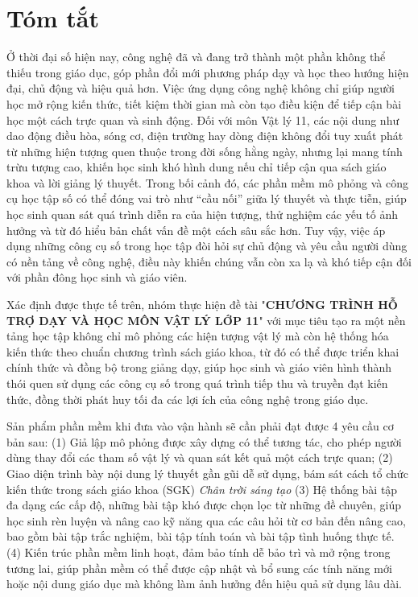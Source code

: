 \chapter*{Tóm tắt}
\thispagestyle{empty}

Ở thời đại số hiện nay, công nghệ đã và đang trở thành một phần không thể thiếu trong giáo dục, góp phần đổi mới phương pháp dạy và học theo hướng hiện đại, chủ động và hiệu quả hơn. Việc ứng dụng công nghệ không chỉ giúp người học mở rộng kiến thức, tiết kiệm thời gian mà còn tạo điều kiện để tiếp cận bài học một cách trực quan và sinh động. Đối với môn Vật lý 11, các nội dung như dao động điều hòa, sóng cơ, điện trường hay dòng điện không đổi tuy xuất phát từ những hiện tượng quen thuộc trong đời sống hằng ngày, nhưng lại mang tính trừu tượng cao, khiến học sinh khó hình dung nếu chỉ tiếp cận qua sách giáo khoa và lời giảng lý thuyết. Trong bối cảnh đó, các phần mềm mô phỏng và công cụ học tập số có thể đóng vai trò như “cầu nối” giữa lý thuyết và thực tiễn, giúp học sinh quan sát quá trình diễn ra của hiện tượng, thử nghiệm các yếu tố ảnh hưởng và từ đó hiểu bản chất vấn đề một cách sâu sắc hơn. Tuy vậy, việc áp dụng những công cụ số trong học tập đòi hỏi sự chủ động và yêu cầu người dùng có nền tảng về công nghệ, điều này khiến chúng vẫn còn xa lạ và khó tiếp cận đối với phần đông học sinh và giáo viên. 

Xác định được thực tế trên, nhóm thực hiện đề tài "\textbf{CHƯƠNG TRÌNH HỖ TRỢ DẠY VÀ HỌC MÔN VẬT LÝ LỚP 11}" với mục tiêu tạo ra một nền tảng học tập không chỉ mô phỏng các hiện tượng vật lý mà còn hệ thống hóa kiến thức theo chuẩn chương trình sách giáo khoa, từ đó có thể được triển khai chính thức và đồng bộ trong giảng dạy, giúp học sinh và giáo viên hình thành thói quen sử dụng các công cụ số trong quá trình tiếp thu và truyền đạt kiến thức, đồng thời phát huy tối đa các lợi ích của công nghệ trong giáo dục.

\vspace{0.5em}

Sản phẩm phần mềm khi đưa vào vận hành sẽ cần phải đạt được 4 yêu cầu cơ bản sau: (1) Giả lập mô phỏng được xây dựng có thể tương tác, cho phép người dùng thay đổi các tham số vật lý và quan sát kết quả một cách trực quan; (2) Giao diện trình bày nội dung lý thuyết gần gũi dễ sử dụng, bám sát cách tổ chức kiến thức trong sách giáo khoa (SGK) \textit{Chân trời sáng tạo} (3) Hệ thống bài tập đa dạng các cấp độ, những bài tập khó được chọn lọc từ những đề chuyên, giúp học sinh rèn luyện và nâng cao kỹ năng qua các câu hỏi từ cơ bản đến nâng cao, bao gồm bài tập trắc nghiệm, bài tập tính toán và bài tập tình huống thực tế. (4) Kiến trúc phần mềm linh hoạt, đảm bảo tính dễ bảo trì và mở rộng trong tương lai, giúp phần mềm có thể được cập nhật và bổ sung các tính năng mới hoặc nội dung giáo dục mà không làm ảnh hưởng đến hiệu quả sử dụng lâu dài.

\clearpage
{}
